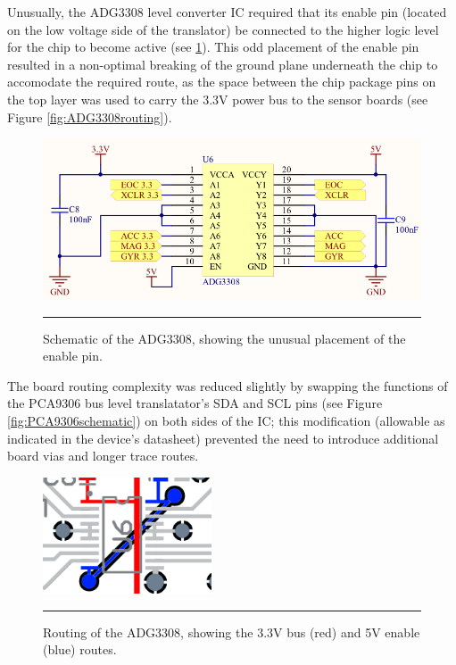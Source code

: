 Unusually, the ADG3308 level converter IC required that its enable pin (located on the low voltage side of the translator) be connected to the higher logic level for the chip to become active (see \ref{fig:ADG3308schematic}). This odd placement of the enable pin resulted in a non-optimal breaking of the ground plane underneath the chip to accomodate the required route, as the space between the chip package pins on the top layer was used to carry the 3.3V power bus to the sensor boards (see Figure \ref{fig:ADG3308routing}).

\begin{figure}[h]
	\centering
		\includegraphics[width=120mm]{./Figures/LevelTranslatorSchematic.png}
	\rule{35em}{0.5pt}
	\caption[Bidirectional Level Translator Schematic]{Schematic of the ADG3308, showing the unusual placement of the enable pin.}
	\label{fig:ADG3308schematic}
\end{figure}

The board routing complexity was reduced slightly by swapping the functions of the PCA9306 bus level translatator's SDA and SCL pins (see Figure \ref{fig:PCA9306schematic}) on both sides of the IC; this modification (allowable as indicated in the device's datasheet) prevented the need to introduce additional board vias and longer trace routes.

\begin{figure}[h]
	\centering
		\includegraphics[width=50mm]{./Figures/LevelConverterRouting.png}
	\rule{35em}{0.5pt}
	\caption[Bidirectional Level Translator Routing]{Routing of the ADG3308, showing the 3.3V bus (red) and 5V enable (blue) routes.}
	\label{fig:PCA9306routing}
\end{figure}


